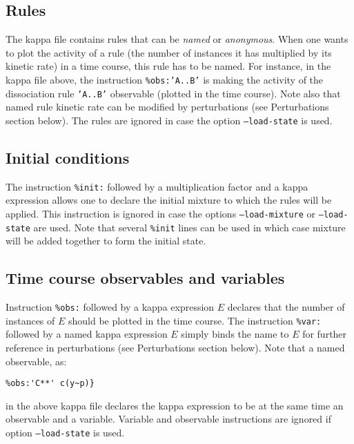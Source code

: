 \documentclass{article}
\begin{document}
\subsection{Rules}
The kappa file contains rules that can be \emph{named} or \emph{anonymous}. When one wants to plot the activity of a rule (the number of instances it has multiplied by its kinetic rate) in a time course, this rule has to be named. For instance, in the kappa file above, the instruction \texttt{\%obs:'A..B'} is making the activity of the dissociation rule \texttt{'A..B'} observable (\ie plotted in the time course).  Note also that named rule kinetic rate can be modified by perturbations (see Perturbations section below). The rules are ignored in case the option \texttt{--load-state} is used.

\subsection{Initial conditions}
The instruction \texttt{\%init:} followed by a multiplication factor and a kappa expression allows one to declare the initial mixture to which the rules will be applied. This instruction is ignored in case the options \texttt{--load-mixture} or \texttt{--load-state} are used. Note that several \texttt{\%init} lines can be used in which case mixture will be added together to form the initial state.

\subsection{Time course observables and variables}
Instruction \texttt{\%obs:} followed by a kappa expression $E$ declares that the number of instances of $E$ should be plotted in the time course. The instruction \texttt{\%var:} followed by a named kappa expression $E$ simply binds the name to $E$ for further reference in perturbations (see Perturbations section below). Note that a named observable, as:
%
\begin{verbatim}
%obs:'C**' c(y~p)}
\end{verbatim}
%
in the above kappa file declares the kappa expression to be at the same time an observable and a variable. Variable and observable instructions are ignored if option \texttt{--load-state} is used. 
\end{document}
